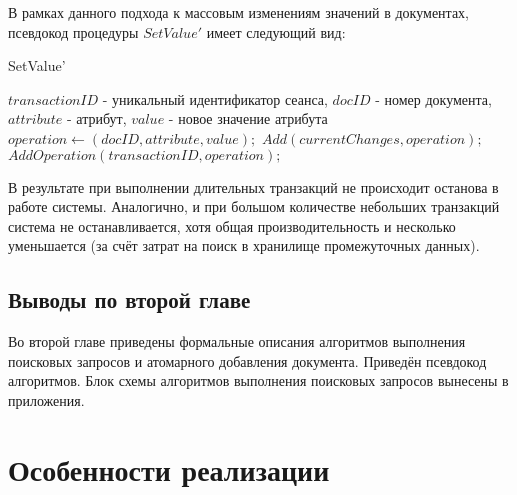 \documentclass{matmex-diploma}
\begin{document}
        В рамках данного подхода к массовым изменениям значений в документах, псевдокод процедуры $SetValue'$ имеет следующий вид:
        
        \begin{algorithm}[H]                   
        \caption{SetValue'}              
        \label{update}                        
            \begin{algorithmic}
                \REQUIRE $transactionID$ - уникальный идентификатор сеанса, $docID$ - номер документа, $attribute$ - атрибут, $value$ - новое значение атрибута
                \STATE $operation \leftarrow (docID, attribute, value);$
                \STATE $Add(currentChanges, operation);$
                \STATE $AddOperation(transactionID, operation);$
            \end{algorithmic}
        \end{algorithm}
        
        В результате при выполнении длительных транзакций не происходит останова в работе системы. Аналогично, и при большом количестве небольших транзакций система не останавливается, хотя общая производительность и несколько уменьшается (за счёт затрат на поиск в хранилище промежуточных данных).
        
    \subsection{Выводы по второй главе}
        Во второй главе приведены формальные описания алгоритмов выполнения поисковых запросов и атомарного добавления документа. Приведён псевдокод алгоритмов. Блок схемы алгоритмов выполнения поисковых запросов вынесены в приложения.
    
\section{Особенности реализации}
\end{document}
